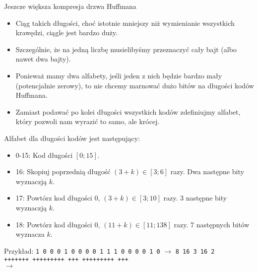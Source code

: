 \documentclass[presentation]{beamer}
\begin{document}
\begin{frame}[label={sec:orgfc3bca2}]{Jeszcze większa kompresja drzwa Huffmana}
\begin{itemize}
\item Ciąg takich długości, choć istotnie mniejszy niż wymienianie
wszystkich krawędzi, ciągle jest bardzo duży.
\item Szczególnie, że na jedną liczbę musielibyśmy przeznaczyć cały bajt
(albo nawet dwa bajty).
\item Ponieważ mamy dwa alfabety, jeśli jeden z nich będzie bardzo mały
(potencjalnie zerowy), to nie chcemy marnować dużo bitów na długości kodów
Huffmana.
\item Zamiast podawać po kolei długości wszystkich kodów zdefiniujmy
alfabet, który pozwoli nam wyrazić to samo, ale krócej.
\end{itemize}
\end{frame}


\begin{frame}[label={sec:org0ab209c}]{Alfabet dla długości kodów jest następujący:}
\begin{itemize}
\item 0-15: Kod długości \([0; 15]\).
\item 16: Skopiuj poprzednią długość \((3 + k) \in [3; 6]\) razy.
Dwa następne bity wyznaczją \(k\).
\item 17: Powtórz kod długości \(0\), \((3 + k) \in [3; 10]\) razy.
3 następne bity wyznaczją \(k\).
\item 18: Powtórz kod długości \(0\), \((11 + k) \in [11; 138]\) razy.
7 następnych bitów wyznacza \(k\).
\end{itemize}

\begin{block}{Przykład:}
\texttt{1 0 0 0 1 0 0 0 0 1 1 1 0 0 0 0 1 0} \(\rightarrow\) \texttt{8 16 3 16 2} \\
\texttt{+++++++ +++++++++ +++ +++++++++ +++} \\

\hspace{10pt} \(\rightarrow\)  \\
\end{block}
\end{frame}
\end{document}
